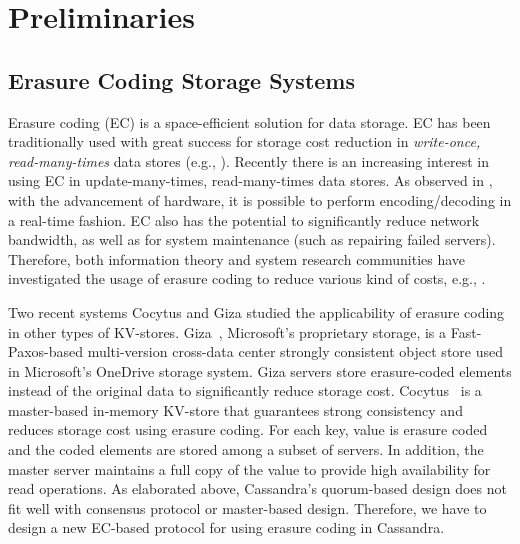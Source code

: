 \section{Preliminaries}

\subsection{Erasure Coding Storage Systems}
Erasure coding (EC) is a space-efficient solution for data storage. 
EC has been traditionally used with great success for storage cost reduction in \textit{write-once, read-many-times} data stores (e.g., \cite{rashmi_fast15, dimakis2011survey, sathiamoorthy, HuaSimXu_etal_azure, DepSky}). Recently there is an increasing interest in using EC in update-many-times, read-many-times data stores. As observed in \cite{Cocytus2016,GIZA2017}, with the advancement of hardware, it is possible to perform encoding/decoding in a real-time fashion.
EC also has the potential to significantly reduce network bandwidth, as well as for system maintenance (such as repairing failed servers).
Therefore, both information theory and system research communities have investigated the usage of erasure coding to reduce various kind of costs, e.g., \cite{dimakis2010network, rashmi2016ec, tamo2014family, wang2018multi}.

Two recent systems Cocytus \cite{Cocytus2016} and Giza \cite{GIZA2017} studied the applicability of erasure coding in other types of KV-stores. 
Giza~\cite{GIZA2017}, Microsoft's proprietary storage,  is a Fast-Paxos-based  multi-version cross-data center strongly consistent object store used in Microsoft's OneDrive storage system. Giza servers store erasure-coded elements instead of the original data to significantly reduce storage cost. 
Cocytus~\cite{Cocytus2016} is a master-based in-memory KV-store that guarantees strong consistency and reduces storage cost using erasure coding.  For each key,  value is erasure coded and the coded elements are stored among a subset of servers. In addition, the master server maintains a full copy of the value to provide high availability for read operations. 
As elaborated above, Cassandra's quorum-based design does not fit well with consensus protocol or master-based design.
Therefore, we have to design a new EC-based protocol for using erasure coding in Cassandra.

